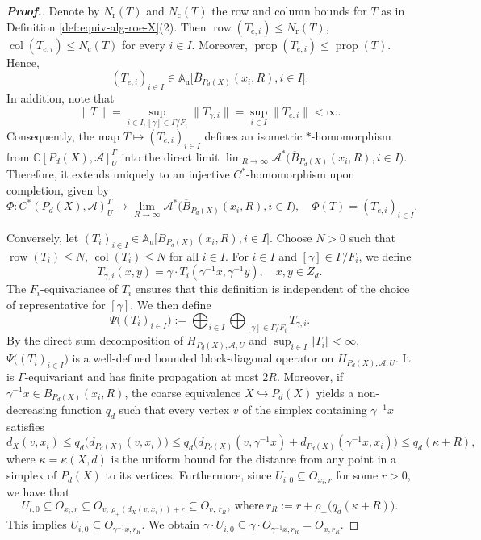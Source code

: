 \documentclass[pdflatex]{sn-jnl}
\theoremstyle{plain}
\theoremstyle{definition}
\begin{document}
\begin{proof}[\textbf{Proof.}]
Denote by $N_{\mathrm r}(T)$ and $N_{\mathrm c}(T)$ the row and column
bounds for $T$ as in Definition
\ref{def:equiv-alg-roe-X}(2). Then
$\operatorname{row}(T_{e,i})\leq N_{\mathrm r}(T)$,
$\operatorname{col}(T_{e,i})\leq N_{\mathrm c}(T)$
for every $i\in I$. Moreover,
$\operatorname{prop}(T_{e,i})
\leq \operatorname{prop}(T)$.
Hence,
\[(T_{e,i})_{i\in I}\in
\mathbb{A}_{\mathrm u}
\bigl[\overline B_{P_{d}(X)}(x_i,R),i\in I\bigr].\]
In addition, note that \begin{equation*}
\|T\|=\sup_{i\in I,[\gamma]\in\Gamma/F_i}\|T_{\gamma,i}\|=\sup_{i\in I}\|T_{e,i}\|<\infty.
\end{equation*}
Consequently,
the map $T\mapsto (T_{e,i})_{i\in I}$ defines an isometric $*$-homomorphism from $\mathbb C[P_{d}(X),\mathcal{A}]^\Gamma_U$ into the direct limit $\lim_{R\to\infty}\mathcal{A}^*\bigl(\overline B_{P_{d}(X)}(x_i,R), i\in I\bigr)$. 
Therefore, it extends uniquely to an injective $C^*$-homomorphism upon completion, given by
\[\Phi: C^*(P_{d}(X),\mathcal{A})^\Gamma_U \longrightarrow\lim_{R\to\infty}\mathcal{A}^*\bigl( \overline B_{P_{d}(X)}(x_i,R), i\in I \bigr),\quad \Phi(T)=(T_{e,i})_{i\in I}.\]\par
Conversely, let
$(T_i)_{i\in I}\in
\mathbb{A}_{\mathrm u}
\bigl[\overline B_{P_{d}(X)}(x_i,R),i\in I\bigr].
$
Choose $N>0$ such that
$\operatorname{row}(T_i)\leq N$,
$\operatorname{col}(T_i)\leq N$
for all $i\in I$. For $i\in I$ and $[\gamma]\in\Gamma/F_i$, we define
\[T_{\gamma,i}(x,y)=
\gamma\cdot
T_i(\gamma^{-1}x,\gamma^{-1}y),
\quad x,y\in Z_{d}.\]
The $F_i$-equivariance of $T_i$ ensures that this definition is independent of the choice of representative for $[\gamma]$. We then define
\[
\Psi\bigl((T_i)_{i\in I}\bigr):=
\bigoplus_{i\in I}
\bigoplus_{[\gamma]\in\Gamma/F_i}
T_{\gamma,i}.\]
By the direct sum decomposition of $H_{P_{d}(X),\mathcal{A},U}$ and $\sup_{i\in I}\Vert{}T_i\Vert{}<\infty$, $\Psi\bigl((T_i)_{i\in I}\bigr)$ is a well-defined bounded block-diagonal operator on $H_{P_{d}(X),\mathcal{A},U}$. It is $\Gamma$-equivariant and has finite propagation at most $2R$. Moreover, if $\gamma^{-1}x \in \overline B_{P_{d}(X)}(x_i,R)$, the coarse equivalence $X\hookrightarrow P_{d}(X)$ yields a non-decreasing function $q_{d}$ such that every vertex $v$ of the simplex containing $\gamma^{-1}x$ satisfies 
\[d_X(v,x_i)\leq q_{d}\bigl(d_{P_{d}(X)}(v,x_{i})\bigr)\leq q_{d}\bigl(d_{P_{d}(X)}(v,\gamma^{-1}x)+d_{P_{d}(X)}(\gamma^{-1}x, x_{i})\bigr)\leq q_{d}(\kappa+R),\]
where $\kappa=\kappa(X,d)$ is the uniform bound for the distance from any point in a simplex of $P_{d}(X)$ to its vertices. Furthermore, 
since $U_{i,0}\subseteq O_{x_i,r}$ for some $r>0$, we have that
\[U_{i,0}\subseteq O_{x_i,r}
\subseteq O_{v,\ \rho_{+}(d_X(v,x_i))+r}\subseteq O_{v,\ r_R},
\ \text{where}\
r_R:=r+\rho_{+}\bigl(q_{d}(\kappa+ R)\bigr).
\]
This implies $U_{i,0}\subseteq O_{\gamma^{-1}x, r_R}$. We obtain
$\gamma\cdot U_{i,0}\subseteq\gamma\cdot O_{\gamma^{-1}x,r_R}=O_{x, r_R}$.


\end{proof}
\end{document}
